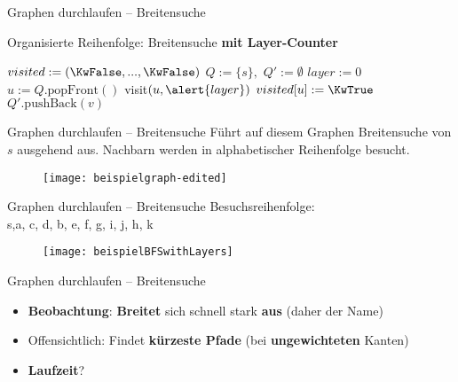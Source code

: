 \begin{frame}{Graphen durchlaufen – Breitensuche}
	\vspace{-.2\baselineskip}
	\begin{exampleblock}{Organisierte Reihenfolge: Breitensuche \textbf{mit Layer-Counter}}
		\begin{algorithm}[H]
			\small
			 {
				$visited := (\KwFalse, ... , \KwFalse)$\;
				$Q := \{s\},$ \quad \alert{$Q' := \emptyset$}   \;
				\alert{$layer := 0$}  \;
				 {
					$u := Q.\text{popFront}()$\;
					 {
						visit$(u, \alert{layer})$   \;
						$visited[u] := \KwTrue$ \;
						 {
							$Q'.\text{pushBack}(v)$   \;
						}
					}
					\alert{
					}
				}
			}
		\end{algorithm} \vspace{-.4\baselineskip}
	\end{exampleblock}
\end{frame}

\begin{frame}{Graphen durchlaufen – Breitensuche}
	Führt auf diesem Graphen Breitensuche von $s$ ausgehend aus. Nachbarn werden in alphabetischer Reihenfolge besucht.
	\begin{figure}[htp]
		\centering
		\texttt{[image: beispielgraph-edited]}
	\end{figure}
\end{frame}

\begin{frame}{Graphen durchlaufen – Breitensuche}
	\solutionheading
	Besuchsreihenfolge: \\ s,\quad a, c, d, \quad b, e, f, g, i, j, \quad h, k
	\begin{figure}[htp]
		\centering
		\texttt{[image: beispielBFSwithLayers]}
	\end{figure}
\end{frame}

\begin{frame}{Graphen durchlaufen – Breitensuche}
	\begin{itemize}
		\item<+-> \textbf{Beobachtung}: \textbf{Breitet} sich schnell stark \textbf{aus} (daher der Name)
		\item<+-> Offensichtlich: Findet \textbf{kürzeste Pfade} (bei \textbf{ungewichteten} Kanten)
		\item<+-> \textbf{Laufzeit}? \visible<+->{$\Theta(n+m)$} \\ 
	\end{itemize}
\end{frame}

